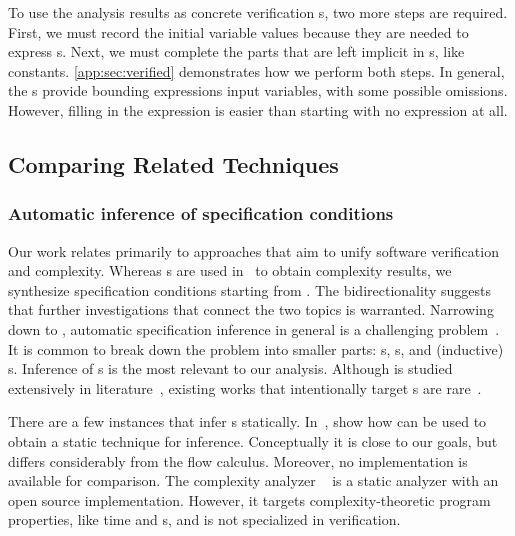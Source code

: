 To use the analysis results as concrete verification s, two more
steps are required. First, we must record the initial variable values because
they are needed to express s. Next, we must complete the
parts that are left implicit in s, like constants.
\autoref{app:sec:verified} demonstrates how we perform both steps. In general,
the s provide bounding expressions \wrt input variables, with
some possible omissions. However, filling in the expression is easier than
starting with no expression at all.

\subsection{Comparing Related Techniques}
\label{sec:related-works}

\subsubsection{Automatic inference of specification conditions}
\label{subsec:automatic-inference}

Our work relates primarily to approaches that aim to unify software verification
and complexity. Whereas s are used in~\cite{nguyen2017} to
obtain complexity results, we synthesize specification conditions starting from
. The bidirectionality suggests that further
investigations that connect the two topics is warranted. Narrowing down to
, automatic specification inference in general is a
challenging problem~\cite{dillig2013,yu2023}. It is common to break down the
problem into smaller parts: s, s, and
(inductive) s. Inference of
s is the most relevant to our analysis. Although
 is studied extensively in
literature~\cite{karr1976,cousot1978,colon2003,sankaranarayanan2004,dillig2013,si2018,ryan2020,yao2020,yu2023,nguyen2014,nguyen2017},
existing works that intentionally target s are
rare~\cite{popeea2006,molina2021}.

There are a few instances that infer s statically.
In~\cite{popeea2006}, show how  can be used to
obtain a static technique for  inference. Conceptually it is
close to our goals, but  differs considerably from
the flow calculus. Moreover, no implementation is available
for comparison. The complexity analyzer ~\cite{giesl2022} is a static
analyzer with an open source implementation. However, it targets
complexity-theoretic program properties, like time and s, and is
not specialized in verification.

